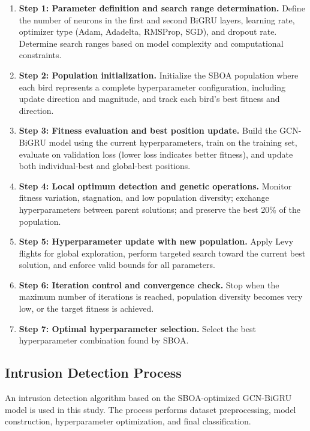 \documentclass[a4paper,fleqn]{cas-sc}
\begin{document}
\begin{enumerate}
\item \textbf{Step 1: Parameter definition and search range determination.} Define the number of neurons in the first and second BiGRU layers, learning rate, optimizer type (Adam, Adadelta, RMSProp, SGD), and dropout rate. Determine search ranges based on model complexity and computational constraints.

\item \textbf{Step 2: Population initialization.} Initialize the SBOA population where each bird represents a complete hyperparameter configuration, including update direction and magnitude, and track each bird's best fitness and direction.

\item \textbf{Step 3: Fitness evaluation and best position update.} Build the GCN-BiGRU model using the current hyperparameters, train on the training set, evaluate on validation loss (lower loss indicates better fitness), and update both individual-best and global-best positions.

\item \textbf{Step 4: Local optimum detection and genetic operations.} Monitor fitness variation, stagnation, and low population diversity; exchange hyperparameters between parent solutions; and preserve the best 20\% of the population.

\item \textbf{Step 5: Hyperparameter update with new population.} Apply Levy flights for global exploration, perform targeted search toward the current best solution, and enforce valid bounds for all parameters.

\item \textbf{Step 6: Iteration control and convergence check.} Stop when the maximum number of iterations is reached, population diversity becomes very low, or the target fitness is achieved.

\item \textbf{Step 7: Optimal hyperparameter selection.} Select the best hyperparameter combination found by SBOA.
\end{enumerate}

\subsection{Intrusion Detection Process}
An intrusion detection algorithm based on the SBOA-optimized GCN-BiGRU model is used in this study. The process performs dataset preprocessing, model construction, hyperparameter optimization, and final classification.
\end{document}
